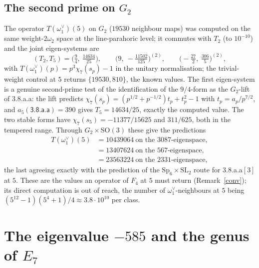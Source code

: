 \documentclass[11pt]{amsart}
\theoremstyle{definition}
\begin{document}
\subsection{The second prime on $G_2$}\label{sec:g2five} The operator $T(\omega_1^\vee)(5)$ on $G_2$ ($19530$ neighbour maps) was computed on the same weight-$2\omega_2$ space at the line-parahoric level; it commutes with $T_2$ (to $10^{-10}$) and the joint eigen-systems are
\[(T_2,T_5)=\Big(\tfrac94,\ \tfrac{14634}{25}\Big),\qquad\Big(9,\ -\tfrac{11502}{125}\Big)^{(2)},\qquad\Big(-\tfrac{27}{2},\ \tfrac{306}{5}\Big)^{(2)},\]
with $T(\omega_1^\vee)(p)=p^3\chi_7(s_p)-1$ in the unitary normalisation; the trivial-weight control at $5$ returns $\{19530,810\}$, the known values. The first eigen-system is a genuine second-prime test of the identification of the $9/4$-form as the $G_2$-lift of \textsf{3.8.a.a}: the lift predicts $\chi_7(s_p)=(p^{1/2}+p^{-1/2})t_p+t_p^2-1$ with $t_p=a_p/p^{7/2}$, and $a_5(\textsf{3.8.a.a})=390$ gives $T_5=14634/25$, exactly the computed value. The two stable forms have $\chi_7(s_5)=-11377/15625$ and $311/625$, both in the tempered range. Through $G_2\times\mathrm{SO}(3)$ these give the predictions
\begin{align*}T(\omega_1^\vee)(5)&=10439064\ \text{on the $3087$-eigenspace},\\ &=13407624\ \text{on the $567$-eigenspace},\\ &=23563224\ \text{on the $2331$-eigenspace},\end{align*}
the last agreeing exactly with the prediction of the $\mathrm{Sp}_6\times\mathrm{SL}_2$ route for \textsf{3.8.a.a}$[3]$ at $5$. These are the values an operator of $F_4$ at $5$ must return (Remark~\ref{conv}); its direct computation is out of reach, the number of $\omega_1^\vee$-neighbours at $5$ being $(5^{12}-1)(5^4+1)/4\approx3.8\cdot10^{10}$ per class.

\section{The eigenvalue $-585$ and the genus of $E_7$}
\end{document}

